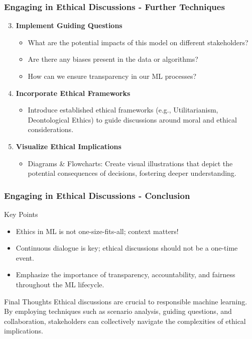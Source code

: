 \documentclass[aspectratio=169]{beamer}
\begin{document}
\begin{frame}[fragile]
    \frametitle{Engaging in Ethical Discussions - Further Techniques}
    \begin{enumerate}
        \setcounter{enumi}{2} %
        \item \textbf{Implement Guiding Questions}
            \begin{itemize}
                \item What are the potential impacts of this model on different stakeholders?
                \item Are there any biases present in the data or algorithms?
                \item How can we ensure transparency in our ML processes?
            \end{itemize}
        
        \item \textbf{Incorporate Ethical Frameworks}
            \begin{itemize}
                \item Introduce established ethical frameworks (e.g., Utilitarianism, Deontological Ethics) to guide discussions around moral and ethical considerations.
            \end{itemize}

        \item \textbf{Visualize Ethical Implications}
            \begin{itemize}
                \item Diagrams \& Flowcharts: Create visual illustrations that depict the potential consequences of decisions, fostering deeper understanding.
            \end{itemize}
    \end{enumerate}
\end{frame}

\begin{frame}[fragile]
    \frametitle{Engaging in Ethical Discussions - Conclusion}
    \begin{block}{Key Points}
        \begin{itemize}
            \item Ethics in ML is not one-size-fits-all; context matters!
            \item Continuous dialogue is key; ethical discussions should not be a one-time event.
            \item Emphasize the importance of transparency, accountability, and fairness throughout the ML lifecycle.
        \end{itemize}
    \end{block}
    \begin{block}{Final Thoughts}
        Ethical discussions are crucial to responsible machine learning. By employing techniques such as scenario analysis, guiding questions, and collaboration, stakeholders can collectively navigate the complexities of ethical implications.
    \end{block}
\end{frame}
\end{document}

